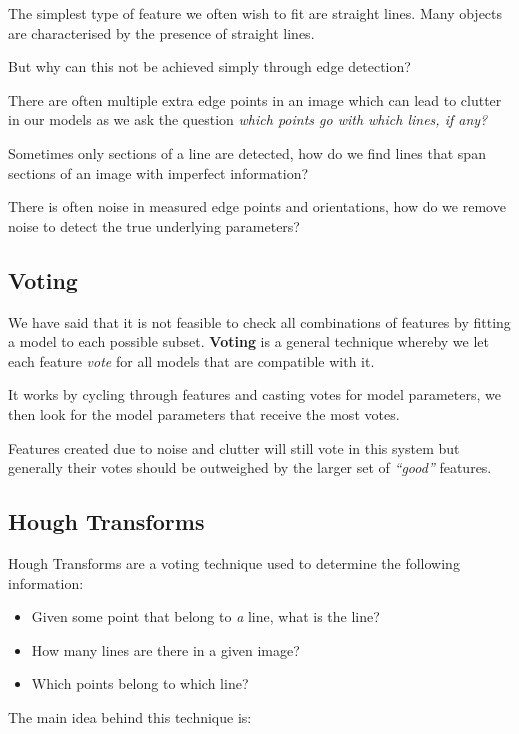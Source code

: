 \documentclass{article}
\begin{document}
The simplest type of feature we often wish to fit are straight lines. Many objects are characterised by the presence of straight lines.

But why can this not be achieved simply through edge detection?

There are often multiple extra edge points in an image which can lead to clutter in our models as we ask the question \textit{which points go with which lines, if any?}

Sometimes only sections of a line are detected, how do we find lines that span sections of an image with imperfect information?

There is often noise in measured edge points and orientations, how do we remove noise to detect the true underlying parameters?

\subsection{Voting}

We have said that it is not feasible to check all combinations of features by fitting a model to each possible subset. \textbf{Voting} is a general technique whereby we let each feature \textit{vote} for all models that are compatible with it.

It works by cycling through features and casting votes for model parameters, we then look for the model parameters that receive the most votes.

Features created due to noise and clutter will still vote in this system but generally their votes should be outweighed by the larger set of \textit{``good''} features.

\subsection{Hough Transforms}

Hough Transforms are a voting technique used to determine the following information:

\begin{itemize}
  \item Given some point that belong to \textit{a} line, what is the line?
  \item How many lines are there in a given image?
  \item Which points belong to which line?
\end{itemize}

The main idea behind this technique is:
\end{document}
